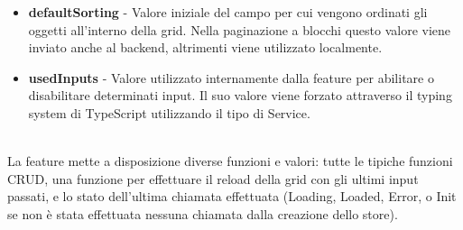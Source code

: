 \begin{itemize}
    in quanto necessario per il corretto funzionamento della feature e del componente generico (per esempio, viene utilizzato nel track del @for di Angular).
  \item \textbf{defaultSorting} - Valore iniziale del campo per cui vengono ordinati gli oggetti all'interno della grid. Nella paginazione a blocchi questo valore viene inviato
    anche al backend, altrimenti viene utilizzato localmente.
  \item \textbf{usedInputs} - Valore utilizzato internamente dalla feature per abilitare o disabilitare determinati input. Il suo valore viene forzato attraverso il typing system
    di TypeScript utilizzando il tipo di Service.
\end{itemize}
\textbf{}\\
La feature mette a disposizione diverse funzioni e valori: tutte le tipiche funzioni CRUD, una funzione per effettuare il reload della grid con gli ultimi input passati,
e lo stato dell'ultima chiamata effettuata (Loading, Loaded, Error, o Init se non \`e stata effettuata nessuna chiamata dalla creazione dello store).
